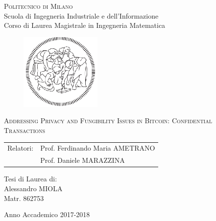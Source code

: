 \begin{titlepage}

	\begin{center}
		\normalsize 
			\textsc{Politecnico di Milano}\\
			Scuola di Ingegneria Industriale e dell'Informazione\\
      		Corso di Laurea Magistrale in Ingegneria Matematica\\
	\end{center}
	\vspace{.6cm}
	
	\begin{figure}[htpb]
		\centering
		\includegraphics[width=4cm]{Cover/polimi}
	\end{figure}
	\vspace{.6cm}
	
	\begin{center}
		\LARGE
			\textsc{Addressing Privacy and Fungibility Issues in Bitcoin: Confidential Transactions}
	\end{center}
	\vspace{1.6cm}

	\begin{flushleft}
		\large
		\begin{tabular}{ll}
		Relatori:    & Prof. Ferdinando Maria AMETRANO      \\
		             & Prof. Daniele MARAZZINA
		\end{tabular}
		\vspace{1cm}
	\end{flushleft}
	
	\begin{flushright}
		\large
		Tesi di Laurea di:\\
		Alessandro MIOLA\\
		Matr. 862753\\		
	\end{flushright}
	
	\vspace*{\fill}
	\begin{center}
		Anno Accademico 2017-2018
	\end{center}
	
\end{titlepage}

